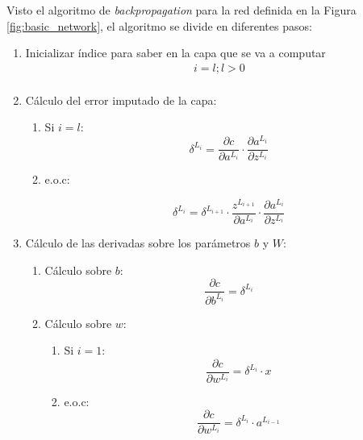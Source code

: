 Visto el algoritmo de \textit{backpropagation} para la red definida en la Figura \ref{fig:basic_network}, el algoritmo se divide en diferentes pasos:
\begin{enumerate}
    
    \item Inicializar índice para saber en la capa que se va a computar
    \begin{equation}
    \begin{split}
        i=l; l > 0 \\
    \end{split}
    \end{equation}
    
    
    \item \label{alg:backpropagation_loop} Cálculo del error imputado de la capa:
    \begin{enumerate}
        \item Si $i=l$:
        \begin{equation}
        \delta^{L_i} = \frac{\partial c}{\partial a^{L_i}} \cdot \frac{\partial a^{L_i}}{\partial z^{L_i}}
        \end{equation}
        
        \item e.o.c:
        
        \begin{equation}
        \delta^{L_i} = \delta^{L_{i+1}} \cdot \frac{z^{L_{i+1}}}{\partial a^{L_i}} \cdot \frac{\partial a^{L_i}}{\partial z^{L_i}}
        \end{equation}
    \end{enumerate}
    
    \item Cálculo de las derivadas sobre los parámetros $b$ y $W$:
    \begin{enumerate}
        \item Cálculo sobre $b$:
        \begin{equation}
        \frac{\partial c}{\partial b^{L_i}} = \delta^{L_{i}}
        \end{equation}
        
        \item Cálculo sobre $w$:
        \begin{enumerate}
            \item Si $i=1$:
                \begin{equation}
                \frac{\partial c}{\partial w^{L_i}} = \delta^{L_{i}} \cdot x
                \end{equation}
            \item e.o.c:
                \begin{equation}
                \frac{\partial c}{\partial w^{L_i}} = \delta^{L_{i}} \cdot a^{L_{i-1}}
                \end{equation}
        \end{enumerate}
    \end{enumerate}
    

\end{enumerate}
